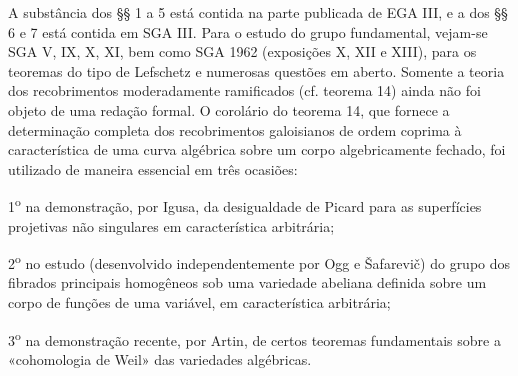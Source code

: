 A substância dos §§ 1 a 5 está contida na parte publicada de EGA III, e
a dos §§ 6 e 7 está contida em SGA III. Para o estudo do grupo
fundamental, vejam-se SGA V, IX, X, XI, bem como SGA 1962 (exposições X, XII e
XIII), para os teoremas do tipo de Lefschetz e numerosas questões em aberto.
Somente a teoria dos recobrimentos moderadamente ramificados (cf. teorema 14)
ainda não foi objeto de uma redação formal. O corolário do teorema 14,
que fornece a determinação completa dos recobrimentos galoisianos de ordem
coprima à característica de uma curva algébrica sobre um corpo
algebricamente fechado, foi utilizado de maneira essencial em três ocasiões:

1\textsuperscript{o} na demonstração, por Igusa, da desigualdade de Picard
para as superfícies projetivas não singulares em característica arbitrária;

2\textsuperscript{o} no estudo (desenvolvido independentemente por Ogg e
Šafarevič) do grupo dos fibrados principais homogêneos sob uma variedade
abeliana definida sobre um corpo de funções de uma variável, em
característica arbitrária;

3\textsuperscript{o} na demonstração recente, por Artin, de certos
teoremas fundamentais sobre a «cohomologia de Weil» das variedades algébricas.
